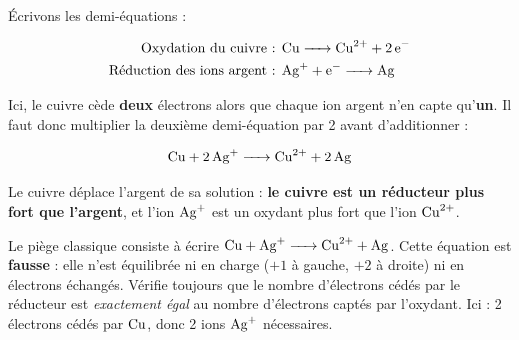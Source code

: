 \documentclass[11pt]{article}
\begin{document}
Écrivons les demi-équations :

\begin{align*}
\text{Oxydation du cuivre : } & \ce{Cu -> Cu^2+ + 2 e-} \\
\text{Réduction des ions argent : } & \ce{Ag+ + e- -> Ag}
\end{align*}

Ici, le cuivre cède \textbf{deux} électrons alors que chaque ion argent n'en capte qu'\textbf{un}. Il faut donc multiplier la deuxième demi-équation par 2 avant d'additionner :

\[ \ce{Cu + 2 Ag+ -> Cu^2+ + 2 Ag} \]

Le cuivre déplace l'argent de sa solution : \textbf{le cuivre est un réducteur plus fort que l'argent}, et l'ion $\ce{Ag+}$ est un oxydant plus fort que l'ion $\ce{Cu^2+}$.

\begin{attention}
Le piège classique consiste à écrire $\ce{Cu + Ag+ -> Cu^2+ + Ag}$. Cette équation est \textbf{fausse} : elle n'est équilibrée ni en charge ($+1$ à gauche, $+2$ à droite) ni en électrons échangés. Vérifie toujours que le nombre d'électrons cédés par le réducteur est \emph{exactement égal} au nombre d'électrons captés par l'oxydant. Ici : 2 électrons cédés par $\ce{Cu}$, donc 2 ions $\ce{Ag+}$ nécessaires.
\end{attention}
\end{document}
